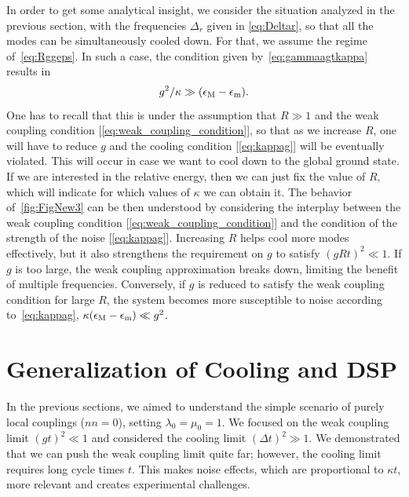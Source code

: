 \documentclass[aps,prx,twocolumn,superscriptaddress,nofootinbib,nolongbibliography,nobalancelastpage,10pt,floatfix]{revtex4-2}
\begin{document}
In order to get some analytical insight, we consider the situation analyzed in the previous section, with the frequencies $\Delta_r$ given in \cref{eq:Deltar}, so that all the modes can be simultaneously cooled down. For that, we assume the regime of~\cref{eq:Rggeps}. In such a case, the condition given by~\cref{eq:gammaagtkappa} results in
\begin{equation}
    g^2/\kappa \gg  (\epsilon_{\rm M}-\epsilon_{\rm m}).
    \label{eq:kappag}
\end{equation}
One has to recall that this is under the assumption that $R\gg 1$ and the weak coupling condition [\cref{eq:weak_coupling_condition}], so that as we increase $R$, one will have to reduce $g$ and the cooling condition [\cref{eq:kappag}] will be eventually violated. This will occur in case we want to cool down to the global ground state. If we are interested in the relative energy, then we can just fix the value of $R$, which will indicate for which values of $\kappa$ we can obtain it. The behavior of~\cref{fig:FigNew3} can be then understood by considering the interplay between the weak coupling condition [\cref{eq:weak_coupling_condition}] and the condition of the strength of the noise [\cref{eq:kappag}]. Increasing $R$ helps cool more modes effectively, but it also strengthens the requirement on $g$ to satisfy $(gRt)^2 \ll 1$. If $g$ is too large, the weak coupling approximation breaks down, limiting the benefit of multiple frequencies. Conversely, if $g$ is reduced to satisfy the weak coupling condition for large $R$, the system becomes more susceptible to noise according to~\cref{eq:kappag}, $\kappa (\epsilon_{\rm M} - \epsilon_{\rm m}) \ll g^2$.



\section{Generalization of Cooling and DSP}
\label{sec:nn_cooling}

In the previous sections, we aimed to understand the simple scenario of purely local couplings ($nn=0$), setting $\lambda_0=\mu_0=1$. We focused on the weak coupling limit $(gt)^2\ll1$ and considered the cooling limit $(\Delta t)^2\gg1$. We demonstrated that we can push the weak coupling limit quite far; however, the cooling limit requires long cycle times $t$. This makes noise effects, which are proportional to $\kappa t$, more relevant and creates experimental challenges.\\
\end{document}

